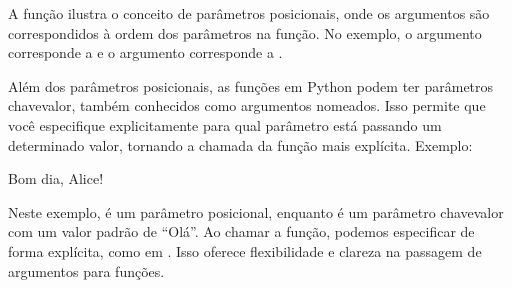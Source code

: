 \documentclass[letterpaper,10pt,english]{jupyterBook}
\begin{document}
\sphinxAtStartPar
A função  ilustra o conceito de parâmetros posicionais, onde os argumentos são correspondidos à ordem dos parâmetros na função. No exemplo, o argumento  corresponde a  e o argumento  corresponde a .

\sphinxAtStartPar
Além dos parâmetros posicionais, as funções em Python podem ter parâmetros chave\sphinxhyphen{}valor, também conhecidos como argumentos nomeados. Isso permite que você especifique explicitamente para qual parâmetro está passando um determinado valor, tornando a chamada da função mais explícita. Exemplo:

\begin{sphinxVerbatim}[commandchars=\\\{\}]
  

 
\end{sphinxVerbatim}

\begin{sphinxVerbatim}[commandchars=\\\{\}]
Bom dia, Alice!
\end{sphinxVerbatim}

\sphinxAtStartPar
Neste exemplo,  é um parâmetro posicional, enquanto  é um parâmetro chave\sphinxhyphen{}valor com um valor padrão de “Olá”. Ao chamar a função, podemos especificar  de forma explícita, como em . Isso oferece flexibilidade e clareza na passagem de argumentos para funções.
\end{document}
